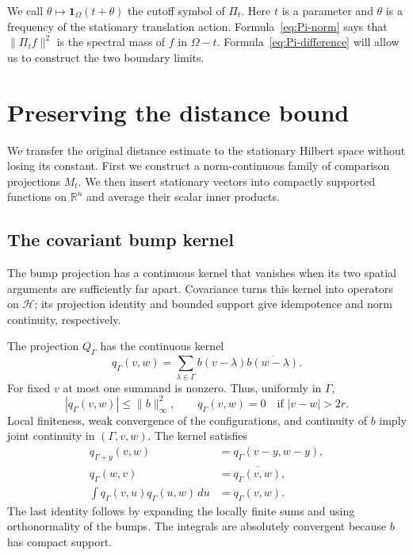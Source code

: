 \documentclass[a4paper,12pt,reqno]{amsart}
\newcommand{\lead}[1]{\par\smallskip\noindent\leavevmode#1\par\smallskip}
\theoremstyle{remark}
\numberwithin{equation}{section}
\newcommand{\R}{\mathbb R}
\newcommand{\Hh}{\mathcal H}
\newcommand{\one}{\mathbf 1}
\begin{document}
We call $\theta\mapsto\one_\Omega(t+\theta)$ the cutoff symbol of
$\Pi_t$. Here $t$ is a parameter and $\theta$ is a frequency of the
stationary translation action. Formula~\eqref{eq:Pi-norm} says that
$\|\Pi_tf\|^2$ is the spectral mass of $f$ in $\Omega-t$.
Formula~\eqref{eq:Pi-difference} will allow us to construct the two
boundary limits.

\section{Preserving the distance bound}\label{sec:distance}

\lead{We transfer the original distance estimate to the stationary Hilbert
space without losing its constant. First we construct a norm-continuous
family of comparison projections $M_t$. We then insert stationary vectors
into compactly supported functions on $\R^n$ and average their scalar
inner products.}


\subsection{The covariant bump kernel}

\lead{The bump projection has a continuous kernel that vanishes when its
two spatial arguments are sufficiently far apart. Covariance turns this
kernel into operators on $\Hh$; its projection identity and bounded
support give idempotence and norm continuity, respectively.}


The projection $Q_\Gamma$ has the continuous kernel
\begin{equation}\label{eq:q-kernel}
 q_\Gamma(v,w)=\sum_{\lambda\in\Gamma}
 b(v-\lambda)\overline{b(w-\lambda)}.
\end{equation}
For fixed $v$ at most one summand is nonzero. Thus, uniformly in $\Gamma$,
\begin{equation}\label{eq:q-bounds}
 |q_\Gamma(v,w)|\leq\|b\|_\infty^2,\qquad
 q_\Gamma(v,w)=0\quad\text{if }|v-w|>2r.
\end{equation}
Local finiteness, weak convergence of the configurations, and continuity
of $b$ imply joint continuity in $(\Gamma,v,w)$. The kernel satisfies
\begin{align}
 q_{\Gamma+y}(v,w)&=q_\Gamma(v-y,w-y),\label{eq:q-covariance}\\
 q_\Gamma(w,v)&=\overline{q_\Gamma(v,w)},\label{eq:q-hermitian}\\
 \int q_\Gamma(v,u)q_\Gamma(u,w)\,du&=q_\Gamma(v,w).
 \label{eq:q-projection}
\end{align}
The last identity follows by expanding the locally finite sums and using
orthonormality of the bumps. The integrals are absolutely convergent because $b$ has compact support.
\end{document}

